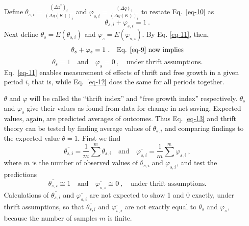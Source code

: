 \documentclass[a4paper,fleqn]{latex_styles/cas-sc}
\begin{document}
%

%
\FloatBarrier

\FloatBarrier
%
%
Define \(\theta_{s,i} = \frac{(\Delta z^{*})_{i}}{(\Delta g{(K)})_{i}}\)
and \(\varphi_{s,i} = \frac{(\Delta q)_{i}}{(\Delta g{(K)})_{i}}\) to
restate Eq.~\eqref{eq-10} as
%
\begin{equation}
\theta_{s,i} + \varphi_{s,i} = 1 \ .\label{eq-11}
\end{equation}
%
Next define \(\theta_s = E(\theta_{s,i})\) and \(\varphi_s = E(\varphi_{s,i})\). By Eq. \eqref{eq-11}, then,
%
\begin{equation}%
    \theta_s + \varphi_s = 1 \ . \quad \text{Eq. \eqref{eq-9} now implies}%
    \label{eq-12}%
\end{equation}%
%
\vspace{-5ex}%
%
\begin{equation}%
    \theta_s = 1 \quad \text{and} \quad \varphi_s = 0 \ , \quad \text{under thrift assumptions.}%
    \label{eq-13}%
\end{equation}%
%
Eq.~\eqref{eq-11} enables measurement of effects of thrift and free growth in a given period \(i\), that is, while Eq.~\eqref{eq-12} does the same for all periods together.

\(\theta\) and \(\varphi\) will be called the ``thrift index'' and
``free growth index'' respectively. \(\theta_{s}\) and
\(\varphi_{s}\) give their values as found from data for change in net
saving. 
%
Expected values, again, are predicted averages of outcomes. Thus Eq. \eqref{eq-13} and thrift theory can be tested by finding average values of \(\theta_{s,i}\) and comparing findings to the expected value \(\theta = 1\). First we find
%
%
\[\overline{\theta_{s,i}} = \frac{1}{m} \sum^{m} \theta_{s,i} \quad \text{and} \quad
\overline{\varphi_{s,i}} = \frac{1}{m} \sum^{m} \varphi_{s,i}\ ,\]
%
where \(m\) is the number of observed values of \(\theta_{s,i}\) and
\(\varphi_{s,i}\), and test the predictions
\[
\overline{\theta_{s,i}} \cong 1 \quad \text{and} \quad \overline{\varphi_{s,i}} \cong 0\ , \quad \text{under thrift assumptions.}
\]
%
Calculations of \(\overline{\theta_{s,i}}\) and
\(\overline{\varphi_{s,i}}\) are not expected to show 1 and 0 exactly,
under thrift assumptions, so that \(\overline{\theta_{s,i}}\) and \(\overline{\varphi_{s,i}}\) are not exactly equal to \(\theta_s\) and \(\varphi_s\), because the number of samples \(m\) is finite.
\end{document}

